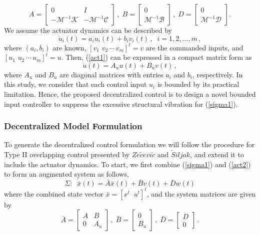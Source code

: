 \documentclass[11pt]{ucthesis}
\begin{document}
\begin{equation}
A = \begin{bmatrix}0&I\\-\mathcal{M}^{-1} \mathcal{K}&-\mathcal{M}^{-1} \mathcal{C} \end{bmatrix}\,,\; B = \begin{bmatrix}0\\\mathcal{M}^{-1} \mathcal{B} \end{bmatrix}\,,\;D = \begin{bmatrix}0\\\mathcal{M}^{-1} \mathcal{D} \end{bmatrix} .
\label{eqn:stateM}
\end{equation}
We assume the actuator dynamics can be described by
\begin{equation}	\label{act1}
\dot{u}_i (t) = a_i u_i (t) + b_i v_i (t) \,,\;\; i = 1,2,\dots, m \,,
\end{equation}
where $(a_i , b_i)$ are known, $[v_1 \,\, v_2 \, \cdots \, v_m]^{t} = v$ are the commanded inputs, and $[u_1 \,\, u_2 \, \cdots \, u_m]^{t} = u$. Then, (\ref{act1}) can be expressed in a compact matrix form as
\begin{equation}	\label{act2}
\dot{u} (t) = A_u u(t) + B_u v(t) \,,
\end{equation}
where $A_u$ and $B_u$ are diagonal matrices with entries $a_i$ and $b_i$, respectively. In this study, we consider that each control input $u_i$ is bounded by its practical limitation. Hence, the proposed decentralized control is to design a novel bounded input controller to suppress the excessive structural vibration for (\ref{sigma1}).    

\subsubsection{Decentralized Model Formulation}
\label{sec:decentral}
To generate the decentralized control formulation we will follow the procedure for Type II overlapping control presented by $Ze\check{c}evi\acute{c}$\cite{zevcevic2005new} and $\check{S}iljak$\cite{siljak2011decentralized}, and extend it to include the actuator dynamics. To start, we first combine (\ref{sigma1}) and (\ref{act2}) to form an augmented system as follows,
\begin{equation}	\label{aug1}
\Sigma : \;\; \dot{\bar{x}} (t) = \bar{A} \bar{x}(t) + \bar{B} v(t) + \bar{D} w(t)
\end{equation}
where the combined state vector $\bar{x}=[x^t \;\; u^t]^t$, and the system matrices are given by
\[
\bar{A} = \left [
\begin{array}{cc}
A & B \\
0 & A_u
\end{array}
\right ]\,,\;\bar{B} = \left [
\begin{array}{c}
0 \\
B_u
\end{array}
\right ] \,,\;\bar{D} = \left [
\begin{array}{c}
D \\
0
\end{array}
\right ] \,.
\]
\end{document}
